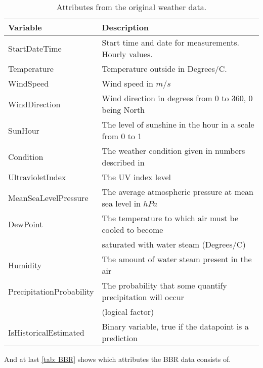 \begin{table}[H]
    \centering
    \begin{tabular}{ll}
     \hline
     \textbf{Variable} & \textbf{Description} \\
    \hline
    \hline
    StartDateTime  &  Start time and date for measurements. Hourly values.\\
    Temperature  &  Temperature outside in Degrees/C. \\
    WindSpeed  & Wind speed in $m/s$\\
    WindDirection  & Wind direction in degrees from 0 to 360, 0 being North \\
    SunHour  & The level of sunshine in the hour in a scale from 0 to 1 \\
    Condition  & The weather condition given in numbers described in \cite{condition} \\
    UltravioletIndex  & The UV index level \\
    MeanSeaLevelPressure  & The average atmospheric pressure at mean sea level in $hPa$ \\
    DewPoint  &  The temperature to which air must be cooled to become \\ & saturated with water steam (Degrees/C)\\
    Humidity  & The amount of water steam present in the air \\
    PrecipitationProbability & The probability that some quantify precipitation will occur \\ & (logical factor)\\
    IsHistoricalEstimated & Binary variable, true if the datapoint is a prediction \\
    \hline
    \end{tabular}
    \caption{Attributes from the original weather data.}
    \label{tab: weatherdata}
\end{table}
\noindent And at last \cref{tab: BBR} shows which attributes the BBR data consists of.
